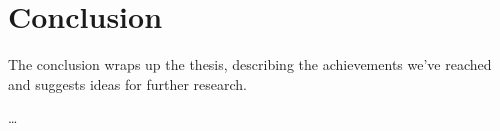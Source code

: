 \chapter*{Conclusion}

The conclusion wraps up the thesis, describing the achievements we've reached and suggests ideas for further research.

\dots